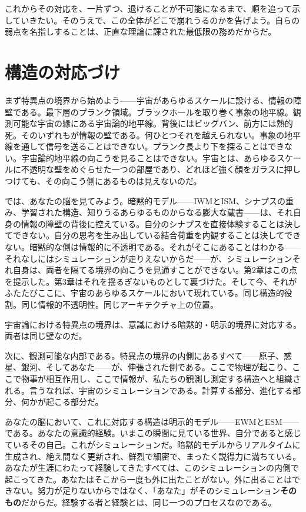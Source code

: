 \documentclass[11pt, twoside, openright]{book}
\begin{document}
これからその対応を、一片ずつ、退けることが不可能になるまで、順を追って示していきたい。そのうえで、この全体がどこで崩れうるのかを告げよう。自らの弱点を名指しすることは、正直な理論に課された最低限の務めだからだ。

\section*{構造の対応づけ}

まず特異点の境界から始めよう------宇宙があらゆるスケールに設ける、情報の障壁である。最下層のプランク領域。ブラックホールを取り巻く事象の地平線。観測可能な宇宙の縁にある宇宙論的地平線。背後にはビッグバン、前方には熱的死。そのいずれもが情報の壁である。何ひとつそれを越えられない。事象の地平線を通して信号を送ることはできない。プランク長より下を探ることはできない。宇宙論的地平線の向こうを見ることはできない。宇宙とは、あらゆるスケールに不透明な壁をめぐらせた一つの部屋であり、どれほど強く顔をガラスに押しつけても、その向こう側にあるものは見えないのだ。

では、あなたの脳を見てみよう。暗黙的モデル------IWMとISM、シナプスの重み、学習された構造、知りうるあらゆるものからなる膨大な蔵書------は、それ自身の情報の障壁の背後に控えている。自分のシナプスを直接体験することは決してできない。自分の思考を生み出している結合荷重を内観することは決してできない。暗黙的な側は情報的に不透明である。それがそこにあることはわかる------それなしにはシミュレーションが走りえないからだ------が、シミュレーションそれ自身は、両者を隔てる境界の向こうを見通すことができない。第2章はこの点を提示した。第3章はそれを揺るぎないものとして裏づけた。そして今、それがふたたびここに、宇宙のあらゆるスケールにおいて現れている。同じ構造的役割。同じ情報的不透明性。同じアーキテクチャ上の位置。

宇宙論における特異点の境界は、意識における暗黙的・明示的境界に対応する。両者は同じ壁なのだ。

次に、観測可能な内部である。特異点の境界の内側にあるすべて------原子、惑星、銀河、そしてあなた------が、伸張された側である。ここで物理が起こり、ここで物事が相互作用し、ここで情報が、私たちの観測し測定する構造へと組織される。言うなれば、宇宙のシミュレーションである。計算する部分、進化する部分、何かが起こる部分だ。

あなたの脳において、これに対応する構造は明示的モデル------EWMとESM------である。あなたの意識的経験。いまこの瞬間に見ている世界、自分であると感じているその自己。これがシミュレーションだ。暗黙的モデルからリアルタイムに生成され、絶え間なく更新され、鮮烈で細密で、まったく説得力に満ちている。あなたが生涯にわたって経験してきたすべては、このシミュレーションの内側で起こってきた。あなたはそこから一度も外に出たことがない。外に出ることはできない。努力が足りないからではなく、「あなた」がそのシミュレーション\textbf{そのもの}だからだ。経験する者と経験とは、同じ一つのプロセスなのである。
\end{document}
